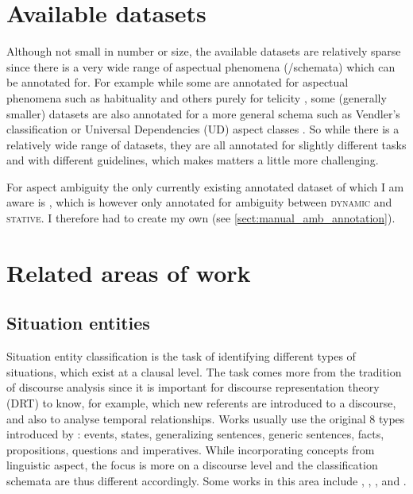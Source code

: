 \section{Available datasets}
Although not small in number or size, the available datasets are relatively sparse since there is a very wide range of aspectual phenomena (/schemata) which can be annotated for. For example while some are annotated for aspectual phenomena such as habituality \citep{mathew2009supervised, ikuta-etal-2014-challenges} and others purely for telicity \citep{friedrich-gateva-2017-classification, kober-etal-2020-aspectuality, metheniti-etal-2022-time}, some (generally smaller) datasets are also annotated for a more general schema such as Vendler's classification \citep{zarcone-lenci-2008-computational, hermes_2015, zellers-choi-2017-zero} or Universal Dependencies (UD) aspect classes \citep{kondratyuk-straka-2019-75}. So while there is a relatively wide range of datasets, they are all annotated for slightly different tasks and with different guidelines, which makes matters a little more challenging.


For aspect ambiguity the only currently existing annotated dataset of which I am aware is \citet{Friedrich2014AutomaticPO}, which is however only annotated for ambiguity between \textsc{dynamic} and \textsc{stative}. I therefore had to create my own (see \ref{sect:manual_amb_annotation}).

\section{Related areas of work}
\subsection*{Situation entities}
\label{sect:sit_ent}
Situation entity classification is the task of identifying different types of situations, which exist at a clausal level. The task comes more from the tradition of discourse analysis since it is important for discourse representation theory (DRT) to know, for example, which new referents are introduced to a discourse, and also to analyse temporal relationships. Works usually use the original 8 types introduced by \citet{Smith_2003}: events, states, generalizing sentences, generic sentences, facts, propositions, questions and imperatives. While incorporating concepts from linguistic aspect, the focus is more on a discourse level and the classification schemata are thus different accordingly. Some works in this area include \citet{palmer-etal-2007-sequencing}, \citet{friedrich-etal-2016-situation}, \citet{becker-etal-2017-classifying}, \citet{friedrich2017states} and \citet{dai-huang-2018-building}.

